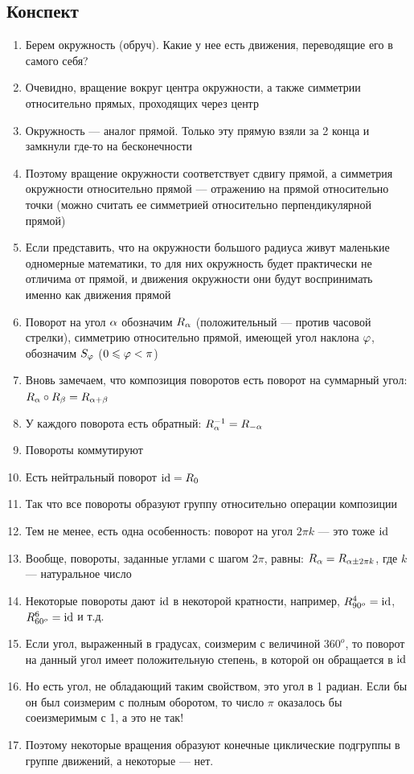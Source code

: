 \subsection{Конспект}
\begin{enumerate}\setlength{\itemsep}{1pt}
\item Берем окружность (обруч). Какие у нее есть движения, переводящие его в самого себя?
\item Очевидно, вращение вокруг центра окружности, а также симметрии относительно прямых, проходящих через центр
\item Окружность --- аналог прямой. Только эту прямую взяли за 2 конца и замкнули где-то на бесконечности
\item Поэтому вращение окружности соответствует сдвигу прямой, а симметрия окружности относительно прямой --- отражению на прямой относительно точки (можно считать ее симметрией относительно перпендикулярной прямой)
\item Если представить, что на окружности большого радиуса живут маленькие одномерные математики, то для них окружность будет практически не отличима от прямой, и движения окружности они будут воспринимать именно как движения прямой
\item Поворот на угол $\alpha$ обозначим $R_\alpha$ (положительный --- против часовой стрелки), симметрию относительно прямой, имеющей угол наклона $\varphi$, обозначим $S_\varphi$ ($0\leqslant\varphi<\pi$)
\item Вновь замечаем, что композиция поворотов есть поворот на суммарный угол: $R_\alpha\circ R_\beta=R_{\alpha+\beta}$
\item У каждого поворота есть обратный: $R_\alpha^{-1}=R_{-\alpha}$
\item Повороты коммутируют
\item Есть нейтральный поворот $\mathrm{id}=R_0$
\item Так что все повороты образуют группу относительно операции композиции
\item Тем не менее, есть одна особенность: поворот на угол $2\pi k$ --- это тоже $\mathrm{id}$
\item Вообще, повороты, заданные углами с шагом $2\pi$, равны: $R_\alpha=R_{\alpha\pm 2\pi k}$, где $k$ --- натуральное число
\item Некоторые повороты дают $\mathrm{id}$ в некоторой кратности, например, $R_{90^o}^4=\mathrm{id}$, $R_{60^o}^6=\mathrm{id}$ и т.д.
\item Если угол, выраженный в градусах, соизмерим с величиной $360^o$, то поворот на данный угол имеет положительную степень, в которой он обращается в $\mathrm{id}$
\item Но есть угол, не обладающий таким свойством, это угол в 1 радиан. Если бы он был соизмерим с полным оборотом, то число $\pi$ оказалось бы соеизмеримым с 1, а это не так!
\item Поэтому некоторые вращения образуют конечные циклические подгруппы в группе движений, а некоторые --- нет.
\end{enumerate}
